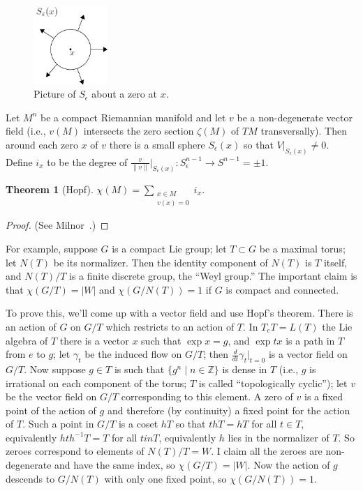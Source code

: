 \documentclass{article}
\newcommand{\Z}{\mathbb{Z}}
\renewcommand{\to}{\longrightarrow}
\newtheorem{thm}{Theorem}[section]
\theoremstyle{definition}
\begin{document}
\begin{figure}
\centering\includegraphics[width=0.25\textwidth]{figures/figure39.pdf}
\caption{\small Picture of $S_\epsilon$ about a zero at $x$.}
\end{figure}
Let $M^n$ be a compact Riemannian manifold and let $v$ be a non-degenerate vector field (i.e., $v(M)$ intersects the zero section $\zeta(M)$ of $TM$ transversally).  Then around each zero $x$ of $v$ there is a small sphere $S_\epsilon(x)$ so that $V|_{S_\epsilon(x)} \ne 0$.  Define $i_x$ to be the degree of $\frac{v}{\|v\|}|_{S_\epsilon(x)}: S^{n-1}_\epsilon \to S^{n-1} = \pm 1$.
\begin{thm}[Hopf]
$\chi(M) = \sum_{\substack{x \in M \\ v(x) = 0}} i_x$.
\end{thm}
\begin{proof}
(See Milnor~\cite{Milnor}.)
\end{proof}
For example, suppose $G$ is a compact Lie group; let $T \subset G$ be a maximal torus; let $N(T)$ be its normalizer.  Then the identity component of $N(T)$ is $T$ itself, and $N(T) / T$ is a finite discrete group, the ``Weyl group.''  The important claim is that $\chi(G / T) = |W|$ and $\chi(G / N(T)) = 1$ if $G$ is compact and connected.

To prove this, we'll come up with a vector field and use Hopf's theorem.  There is an action of $G$ on $G/T$ which restricts to an action of $T$.  In $T_eT = L(T)$ the Lie algebra of $T$ there is a vector $x$ such that $\exp x = g$, and $\exp tx$ is a path in $T$ from $e$ to $g$; let $\gamma_t$ be the induced flow on $G/T$; then $\frac{d}{dt} \gamma_t |_{t = 0}$ is a vector field on $G/T$.  Now suppose $g \in T$ is such that $\{g^n \mid n \in \Z\}$ is dense in $T$ (i.e., $g$ is irrational on each component of the torus; $T$ is called ``topologically cyclic''); let $v$ be the vector field on $G/T$ corresponding to this element.  A zero of $v$ is a fixed point of the action of $g$ and therefore (by continuity) a fixed point for the action of $T$.  Such a point in $G/T$ is a coset $hT$ so that $thT = hT$ for all $t \in T$, equivalently $hth^{-1} T = T$ for all $t in T$, equivalently $h$ lies in the normalizer of $T$.  So zeroes correspond to elements of $N(T) / T = W$.  I claim all the zeroes are non-degenerate and have the same index, so $\chi(G/T) = |W|$.  Now the action of $g$ descends to $G/N(T)$ with only one fixed point, so $\chi(G/N(T)) = 1$.
\end{document}
